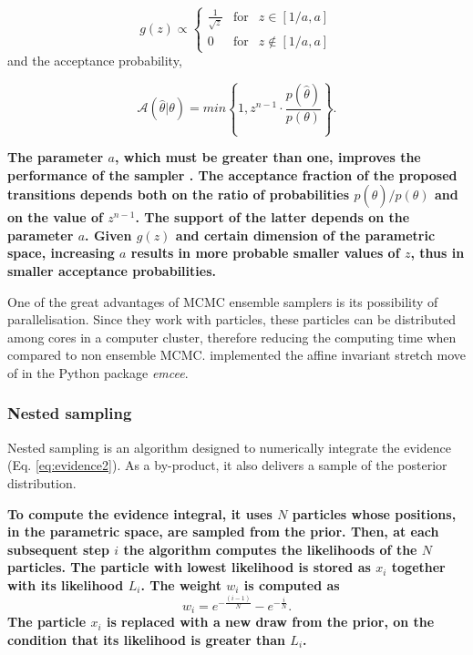 \begin{equation}
g(z) \propto \left\{ \begin{array}{rcl}
         \frac{1}{\sqrt{z}} & \mbox{for}&  z\in[1/a,a] \\ 
         0  & \mbox{for} &  z\notin[1/a,a]
                \end{array}\right.
\label{eq:gz}
\end{equation} 
and the acceptance probability,

\begin{equation}
\mathcal{A}(\hat{\theta}|\theta)=min\left\{1,z^{n-1}\cdot \frac{p(\hat{\theta})}{p(\theta)}\right\}.
\end{equation} 

\textbf{The parameter $a$, which must be greater than one, improves the performance of the sampler \citep{Goodman2010}. The acceptance fraction of the proposed transitions depends both on the ratio of probabilities $p(\hat{\theta})/p(\theta)$ and on the value of $z^{n-1}$. The support of the latter depends on the parameter $a$. Given $g(z)$ and certain dimension of the parametric space, increasing $a$ results in more probable smaller values of $z$, thus in smaller acceptance probabilities.}

One of the great advantages of MCMC ensemble samplers  is its possibility of parallelisation. Since they work with particles, these particles can be distributed among cores in a computer cluster, therefore reducing the computing time when compared to non ensemble MCMC. \citet{Foreman2013} implemented the affine invariant stretch move of \citet{Goodman2010} in the Python package \emph{emcee}. 
\subsubsection{Nested sampling}
\label{sect:NestedSampling}
Nested sampling \citep{Skilling2004,Skilling2006} is an algorithm designed to numerically integrate the evidence (Eq. \ref{eq:evidence2}). As a by-product, it also delivers a sample of the posterior distribution. 

\textbf{To compute the evidence integral, it uses $N$ particles whose positions, in the parametric space, are sampled from the prior. Then, at each subsequent step $i$ the algorithm computes the likelihoods of the $N$ particles. The particle with lowest likelihood is stored as $x_i$ together with its likelihood $L_{i}$. The weight $w_i$ is computed as}
\begin{equation}
w_i = e^{-\frac{(i-1)}{N}} - e^{-\frac{i}{N}}. \nonumber 
\end{equation}
\textbf{The particle $x_i$ is replaced with a new draw from the prior, on the condition that its likelihood is greater than $L_i$. }

